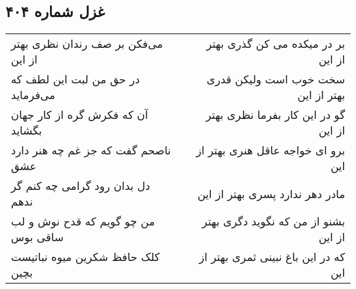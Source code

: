 \begin{center}
\section*{غزل شماره ۴۰۴}
\label{sec:sh404}
\begin{longtable}{l p{0.5cm} r}
می‌فکن بر صف رندان نظری بهتر از این
&&
بر در میکده می کن گذری بهتر از این
\\
در حق من لبت این لطف که می‌فرماید
&&
سخت خوب است ولیکن قدری بهتر از این
\\
آن که فکرش گره از کار جهان بگشاید
&&
گو در این کار بفرما نظری بهتر از این
\\
ناصحم گفت که جز غم چه هنر دارد عشق
&&
برو ای خواجه عاقل هنری بهتر از این
\\
دل بدان رود گرامی چه کنم گر ندهم
&&
مادر دهر ندارد پسری بهتر از این
\\
من چو گویم که قدح نوش و لب ساقی بوس
&&
بشنو از من که نگوید دگری بهتر از این
\\
کلک حافظ شکرین میوه نباتیست بچین
&&
که در این باغ نبینی ثمری بهتر از این
\\
\end{longtable}
\end{center}
